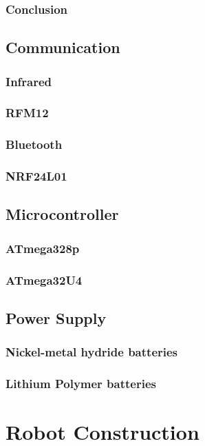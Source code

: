 \documentclass[11pt,a4paper]{article}
\begin{document}
\subsubsection{Conclusion}
\subsection{Communication}
\subsubsection{Infrared}
\subsubsection{RFM12}
\subsubsection{Bluetooth}
\subsubsection{NRF24L01}

\subsection{Microcontroller}

\subsubsection{ATmega328p}
\subsubsection{ATmega32U4}

\subsection{Power Supply}
\subsubsection{Nickel-metal hydride batteries}
\subsubsection{Lithium Polymer batteries}

\section{Robot Construction}



\nocite{*}
\printbibliography
{}
\end{document}
